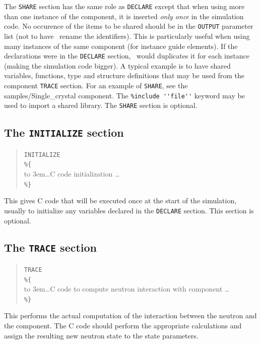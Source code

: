 The \texttt{SHARE} section has the same role as \texttt{DECLARE} except that when using more than one instance of the component, it is inserted \emph{only once} in the simulation code. No occurence of the items to be shared should be in the \texttt{OUTPUT} parameter list (not to have \MCS\ rename the identifiers).
This is particularly useful when using many instances of the same component (for instance guide elements). If the declarations were in the \texttt{DECLARE} section, \MCS\ would duplicates it for each instance (making the simulation code bigger).
A typical example is to have shared variables, functions, type and structure definitions that may be used from the component \texttt{TRACE} section. For an
example of \texttt{SHARE}, see the samples/Single\_crystal
component. The \verb+%include ''file''+ keyword may be used to import
a shared library. The \texttt{SHARE} section is optional.

\subsection{The \texttt{INITIALIZE} section}
\label{s:comp-initialize}

\begin{quote}
  \texttt{INITIALIZE} \\
  \verb|%{| \\
  \hbox to 3em{}\ldots C code initialization \ldots \\
  \verb|%}|
\end{quote}
This gives C code that will be executed once at the start of the
simulation, usually to initialize any variables declared in the
\texttt{DECLARE} section. This section is optional.


\subsection{The \texttt{TRACE} section}
\label{s:comp-trace}

\begin{quote}
  \texttt{TRACE} \\
  \verb|%{| \\
  \hbox to 3em{}\ldots C code to compute neutron interaction with
    component \ldots \\
  \verb|%}|
\end{quote}
This performs the actual computation of the interaction between the neutron
and the component. The C code should perform the appropriate
calculations and assign the resulting new neutron state to the state
parameters.

